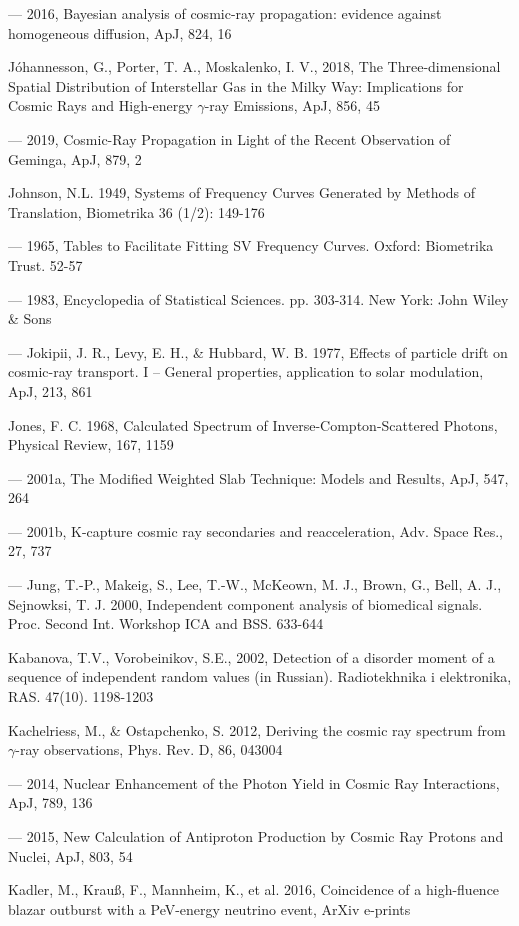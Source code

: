 --- 2016, Bayesian analysis of cosmic-ray propagation: evidence against homogeneous diffusion, ApJ, 824, 16

J\'ohannesson, G., Porter, T. A., Moskalenko, I. V., 2018, The Three-dimensional Spatial Distribution of Interstellar Gas in the Milky Way: Implications for Cosmic Rays and High-energy $\gamma$-ray Emissions, ApJ, 856, 45

--- 2019, Cosmic-Ray Propagation in Light of the Recent Observation of Geminga, ApJ, 879, 2

Johnson, N.L. 1949, Systems of Frequency Curves Generated by Methods of Translation, Biometrika 36 (1/2): 149-176

--- 1965, Tables to Facilitate Fitting SV Frequency Curves. Oxford: Biometrika Trust. 52-57

--- 1983, Encyclopedia of Statistical Sciences. pp. 303-314. New York: John Wiley \& Sons 

--- Jokipii, J. R., Levy, E. H., \& Hubbard, W. B. 1977, Effects of particle drift on cosmic-ray transport. I -- General properties, application to solar modulation, ApJ, 213, 861

Jones, F. C. 1968, Calculated Spectrum of Inverse-Compton-Scattered Photons, Physical Review, 167, 1159

--- 2001a, The Modified Weighted Slab Technique: Models and Results, ApJ, 547, 264

--- 2001b, K-capture cosmic ray secondaries and reacceleration, Adv. Space Res., 27, 737 

--- Jung, T.-P., Makeig, S., Lee, T.-W., McKeown, M. J., Brown, G., Bell, A. J., Sejnowksi, T. J. 2000, Independent component analysis of biomedical signals. Proc. Second Int. Workshop ICA and BSS. 633-644

Kabanova, T.V., Vorobeinikov, S.E., 2002, Detection of a disorder moment of a sequence of independent random values (in Russian). Radiotekhnika i elektronika, RAS. 47(10). 1198-1203

Kachelriess, M., \& Ostapchenko, S. 2012, Deriving the cosmic ray spectrum from $\gamma$-ray observations, Phys. Rev. D, 86, 043004

--- 2014, Nuclear Enhancement of the Photon Yield in Cosmic Ray Interactions, ApJ, 789, 136

--- 2015, New Calculation of Antiproton Production by Cosmic Ray Protons and Nuclei, ApJ, 803, 54

Kadler, M., Krau\ss, F., Mannheim, K., et al. 2016, Coincidence of a high-fluence blazar outburst with a PeV-energy neutrino event, ArXiv e-prints


